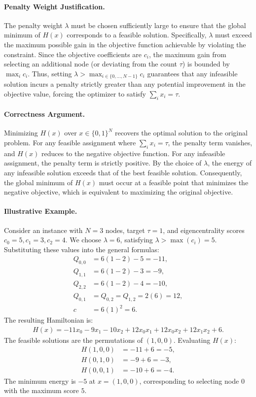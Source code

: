 \documentclass[12pt]{article}
\begin{document}
\paragraph{Penalty Weight Justification.}
The penalty weight $\lambda$ must be chosen sufficiently large to ensure that the global minimum of $H(x)$ corresponds to a feasible solution. Specifically, $\lambda$ must exceed the maximum possible gain in the objective function achievable by violating the constraint. Since the objective coefficients are $c_i$, the maximum gain from selecting an additional node (or deviating from the count $\tau$) is bounded by $\max_{i} c_i$. Thus, setting $\lambda > \max_{i \in \{0, \dots, N-1\}} c_i$ guarantees that any infeasible solution incurs a penalty strictly greater than any potential improvement in the objective value, forcing the optimizer to satisfy $\sum_{i} x_i = \tau$.

\paragraph{Correctness Argument.}
Minimizing $H(x)$ over $x \in \{0,1\}^N$ recovers the optimal solution to the original problem. For any feasible assignment where $\sum_{i} x_i = \tau$, the penalty term vanishes, and $H(x)$ reduces to the negative objective function. For any infeasible assignment, the penalty term is strictly positive. By the choice of $\lambda$, the energy of any infeasible solution exceeds that of the best feasible solution. Consequently, the global minimum of $H(x)$ must occur at a feasible point that minimizes the negative objective, which is equivalent to maximizing the original objective.

\paragraph{Illustrative Example.}
Consider an instance with $N=3$ nodes, target $\tau=1$, and eigencentrality scores $c_0=5, c_1=3, c_2=4$. We choose $\lambda=6$, satisfying $\lambda > \max(c_i)=5$. Substituting these values into the general formulas:
\begin{align}
    Q_{0,0} &= 6(1 - 2) - 5 = -11, \\
    Q_{1,1} &= 6(1 - 2) - 3 = -9, \\
    Q_{2,2} &= 6(1 - 2) - 4 = -10, \\
    Q_{0,1} &= Q_{0,2} = Q_{1,2} = 2(6) = 12, \\
    c &= 6(1)^2 = 6.
\end{align}
The resulting Hamiltonian is:
\begin{align}
    H(x) = -11 x_0 - 9 x_1 - 10 x_2 + 12 x_0 x_1 + 12 x_0 x_2 + 12 x_1 x_2 + 6.
\end{align}
The feasible solutions are the permutations of $(1,0,0)$. Evaluating $H(x)$:
\begin{align}
    H(1,0,0) &= -11 + 6 = -5, \\
    H(0,1,0) &= -9 + 6 = -3, \\
    H(0,0,1) &= -10 + 6 = -4.
\end{align}
The minimum energy is $-5$ at $x=(1,0,0)$, corresponding to selecting node $0$ with the maximum score $5$.
\end{document}
